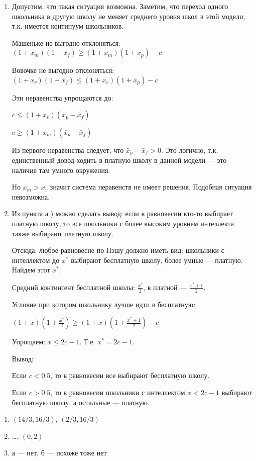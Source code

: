 \begin{solution}{4.49}
\begin{enumerate}
\item Допустим, что такая ситуация возможна. Заметим, что переход одного школьника в другую школу не меняет среднего уровня школ в этой модели, т.к. имеется континуум школьников. \par
Машеньке не выгодно отклоняться: $(1+x_{m})(1+\bar{x}_{f})\ge (1+x_{m})(1+\bar{x}_{p})-c$ \par
Вовочке не выгодно отклоняться: $(1+x_{v})(1+\bar{x}_{f})\le (1+x_{v})(1+\bar{x}_{p})-c$ \par
Эти неравенства упрощаются до: \par
$c\le (1+x_{v})(\bar{x}_{p}-\bar{x}_{f})$ \par
$c\ge (1+x_{m})(\bar{x}_{p}-\bar{x}_{f})$ \par
Из первого неравенства следует, что $\bar{x}_{p}-\bar{x}_{f}>0$. Это логично, т.к. единственный довод ходить в платную школу в данной модели --- это наличие там умного окружения. \par
Но $x_{m}>x_{v}$ значит система неравенств не имеет решения. Подобная ситуация невозможна. \par
\item Из пункта а ) можно сделать вывод: если в равновесии кто-то выбирает платную школу, то все школьники с более высоким уровнем интеллекта также выбирают платную школу. \par
Отсюда: любое равновесие по Нэшу должно иметь вид: школьники с интеллектом до $x^{*}$ выбирают бесплатную школу, более умные --- платную. Найдем этот $x^{*}$. \par
Средний контингент бесплатной школы: $\frac{x^{*}}{2}$, в платной --- $\frac{x^{*}+1}{2}$. \par
Условие при котором школьнику лучше идти в бесплатную: \par
$(1+x)(1+\frac{x^{*}}{2})\ge (1+x)(1+\frac{x^{*}+1}{2})-c$ \par
Упрощаем: $x\le 2c-1$. Т.е. $x^{*}=2c-1$. \par
Вывод: \par
Если $c<0.5$, то в равновесии все выбирают бесплатную школу. \par
Если $c>0.5$, то в равновесии школьники с интеллектом $x<2c-1$ выбирают бесплатную школу, а остальные --- платную.
\end{enumerate}
\end{solution}
\begin{solution}{4.50}
\begin{enumerate}
\item $(14/3,16/3)$, $(2/3,16/3)$ \par
\item \ldots, $(0,2)$ \par
\item  а --- нет, б --- похоже тоже нет
\end{enumerate}
\end{solution}
